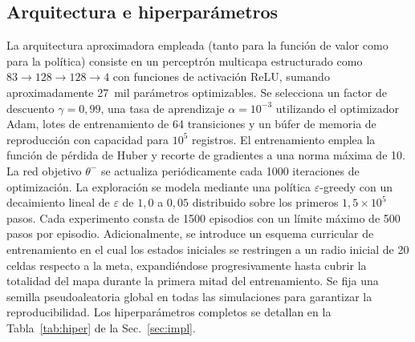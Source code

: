 \subsection{Arquitectura e hiperparámetros}
La arquitectura aproximadora empleada (tanto para la función de valor como para la política) consiste en un perceptrón multicapa estructurado como $83 \to 128 \to 128 \to 4$ con funciones de activación ReLU, sumando aproximadamente 27~mil parámetros optimizables. Se selecciona un factor de descuento $\gamma=0{,}99$, una tasa de aprendizaje $\alpha=10^{-3}$ utilizando el optimizador Adam, lotes de entrenamiento de 64 transiciones y un búfer de memoria de reproducción con capacidad para $10^5$ registros. El entrenamiento emplea la función de pérdida de Huber y recorte de gradientes a una norma máxima de 10. La red objetivo $\theta^-$ se actualiza periódicamente cada 1000 iteraciones de optimización. La exploración se modela mediante una política $\varepsilon$-greedy con un decaimiento lineal de $\varepsilon$ de $1{,}0$ a $0{,}05$ distribuido sobre los primeros $1{,}5\times10^{5}$ pasos. Cada experimento consta de 1500 episodios con un límite máximo de 500 pasos por episodio. Adicionalmente, se introduce un esquema curricular de entrenamiento en el cual los estados iniciales se restringen a un radio inicial de 20 celdas respecto a la meta, expandiéndose progresivamente hasta cubrir la totalidad del mapa durante la primera mitad del entrenamiento. Se fija una semilla pseudoaleatoria global en todas las simulaciones para garantizar la reproducibilidad. Los hiperparámetros completos se detallan en la Tabla~\ref{tab:hiper} de la Sec.~\ref{sec:impl}.
